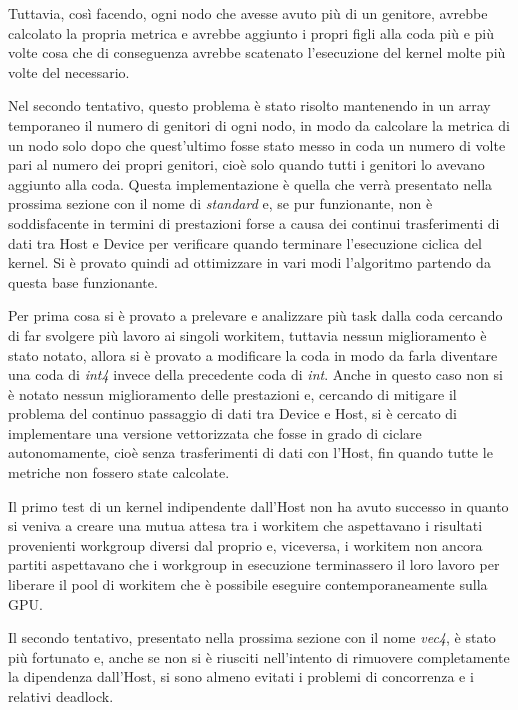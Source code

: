 \documentclass[../relazione.tex]{subfiles}
\begin{document}
Tuttavia, così facendo, ogni nodo che avesse avuto più di un genitore, avrebbe calcolato la propria metrica e avrebbe aggiunto i propri figli alla coda più e più volte cosa che di conseguenza avrebbe scatenato l'esecuzione del kernel molte più volte del necessario.

Nel secondo tentativo, questo problema è stato risolto mantenendo in un array temporaneo il numero di genitori di ogni nodo, in modo da calcolare la metrica di un nodo solo dopo che quest'ultimo fosse stato messo in coda un numero di volte pari al numero dei propri genitori, cioè solo quando tutti i genitori lo avevano aggiunto alla coda. Questa implementazione è quella che verrà presentato nella prossima sezione con il nome di \textit{standard} e, se pur funzionante, non è soddisfacente in termini di prestazioni forse a causa dei continui trasferimenti di dati tra Host e Device per verificare quando terminare l'esecuzione ciclica del kernel. Si è provato quindi ad ottimizzare in vari modi l'algoritmo partendo da questa base funzionante.

Per prima cosa si è provato a prelevare e analizzare più task dalla coda cercando di far svolgere più lavoro ai singoli workitem, tuttavia nessun miglioramento è stato notato, allora si è provato a modificare la coda in modo da farla diventare una coda di \textit{int4} invece della precedente coda di \textit{int}. Anche in questo caso non si è notato nessun miglioramento delle prestazioni e, cercando di mitigare il problema del continuo passaggio di dati tra Device e Host, si è cercato di implementare una versione vettorizzata che fosse in grado di ciclare autonomamente, cioè senza trasferimenti di dati con l'Host, fin quando tutte le metriche non fossero state calcolate.


Il primo test di un kernel indipendente dall'Host non ha avuto successo in quanto si veniva a creare una mutua attesa tra i workitem che aspettavano i risultati provenienti workgroup diversi dal proprio e, viceversa, i workitem non ancora partiti aspettavano che i workgroup in esecuzione terminassero il loro lavoro per liberare il pool di workitem che è possibile eseguire contemporaneamente sulla GPU.


Il secondo tentativo, presentato nella prossima sezione con il nome \textit{vec4}, è stato più fortunato e, anche se non si è riusciti nell'intento di rimuovere completamente la dipendenza dall'Host, si sono almeno evitati i problemi di concorrenza e i relativi deadlock. 
\end{document}
